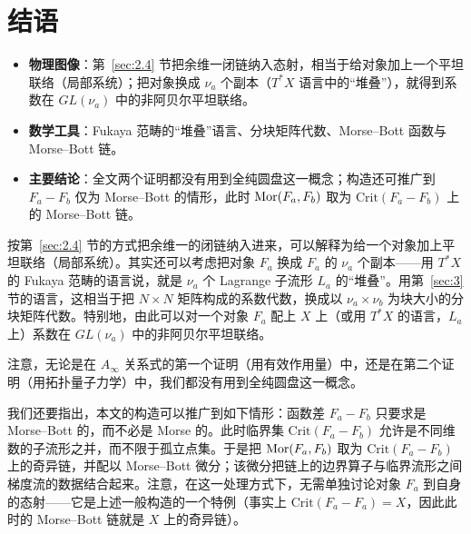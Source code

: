 \section{结语}\label{sec:5}

\begin{takeaway}
\begin{itemize}
  \item \textbf{物理图像}：第~\ref{sec:2.4} 节把余维一闭链纳入态射，相当于给对象加上一个平坦联络（局部系统）；把对象换成 $\nu_a$ 个副本（$T^*X$ 语言中的“堆叠”），就得到系数在 $GL(\nu_a)$ 中的非阿贝尔平坦联络。
  \item \textbf{数学工具}：Fukaya 范畴的“堆叠”语言、分块矩阵代数、Morse--Bott 函数与 Morse--Bott 链。
  \item \textbf{主要结论}：全文两个证明都没有用到全纯圆盘这一概念；构造还可推广到 $F_a-F_b$ 仅为 Morse--Bott 的情形，此时 $\operatorname{Mor}(F_a,F_b)$ 取为 $\mathrm{Crit}(F_a-F_b)$ 上的 Morse--Bott 链。
\end{itemize}
\end{takeaway}

按第~\ref{sec:2.4} 节的方式把余维一的闭链纳入进来，可以解释为给一个对象加上平坦联络（局部系统）。其实还可以考虑把对象 $F_a$ 换成 $F_a$ 的 $\nu_a$ 个副本——用 $T^*X$ 的 Fukaya 范畴的语言说，就是 $\nu_a$ 个 Lagrange 子流形 $L_a$ 的“堆叠”。用第~\ref{sec:3} 节的语言，这相当于把 $N\times N$ 矩阵构成的系数代数，换成以 $\nu_a\times\nu_b$ 为块大小的分块矩阵代数。特别地，由此可以对一个对象 $F_a$ 配上 $X$ 上（或用 $T^*X$ 的语言，$L_a$ 上）系数在 $GL(\nu_a)$ 中的非阿贝尔平坦联络。



注意，无论是在 $A_\infty$ 关系式的第一个证明（用有效作用量）中，还是在第二个证明（用拓扑量子力学）中，我们都没有用到全纯圆盘这一概念。

我们还要指出，本文的构造可以推广到如下情形：函数差 $F_a-F_b$ 只要求是 Morse--Bott 的，而不必是 Morse 的。此时临界集 $\mathrm{Crit}(F_a-F_b)$ 允许是不同维数的子流形之并，而不限于孤立点集。于是把 $\operatorname{Mor}(F_a,F_b)$ 取为 $\mathrm{Crit}(F_a-F_b)$ 上的奇异链，并配以 Morse--Bott 微分；该微分把链上的边界算子与临界流形之间梯度流的数据结合起来。注意，在这一处理方式下，无需单独讨论对象 $F_a$ 到自身的态射——它是上述一般构造的一个特例（事实上 $\mathrm{Crit}(F_a-F_a)=X$，因此此时的 Morse--Bott 链就是 $X$ 上的奇异链）。


\endinput
